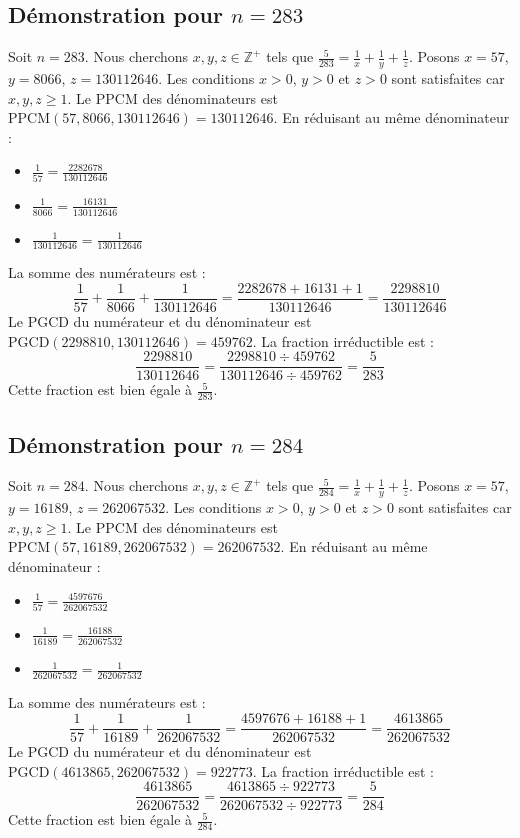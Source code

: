 \documentclass[11pt,a4paper]{article}
\begin{document}
\subsection{Démonstration pour $n = 283$}
Soit $n = 283$. Nous cherchons $x, y, z \in \mathbb{Z}^{+}$ tels que $\frac{5}{283} = \frac{1}{x} + \frac{1}{y} + \frac{1}{z}$.
Posons $x = 57$, $y = 8066$, $z = 130112646$.
Les conditions $x > 0$, $y > 0$ et $z > 0$ sont satisfaites car $x, y, z \geq 1$.
Le PPCM des dénominateurs est $\text{PPCM}(57, 8066, 130112646) = 130112646$.
En réduisant au même dénominateur :
\begin{itemize}
    \item $\frac{1}{57} = \frac{2282678}{130112646}$
    \item $\frac{1}{8066} = \frac{16131}{130112646}$
    \item $\frac{1}{130112646} = \frac{1}{130112646}$
\end{itemize}
La somme des numérateurs est :
$$ \frac{1}{57} + \frac{1}{8066} + \frac{1}{130112646} = \frac{2282678 + 16131 + 1}{130112646} = \frac{2298810}{130112646} $$
Le PGCD du numérateur et du dénominateur est $\text{PGCD}(2298810, 130112646) = 459762$.
La fraction irréductible est :
$$ \frac{2298810}{130112646} = \frac{2298810 \div 459762}{130112646 \div 459762} = \frac{5}{283} $$
Cette fraction est bien égale à $\frac{5}{283}$.

\subsection{Démonstration pour $n = 284$}
Soit $n = 284$. Nous cherchons $x, y, z \in \mathbb{Z}^{+}$ tels que $\frac{5}{284} = \frac{1}{x} + \frac{1}{y} + \frac{1}{z}$.
Posons $x = 57$, $y = 16189$, $z = 262067532$.
Les conditions $x > 0$, $y > 0$ et $z > 0$ sont satisfaites car $x, y, z \geq 1$.
Le PPCM des dénominateurs est $\text{PPCM}(57, 16189, 262067532) = 262067532$.
En réduisant au même dénominateur :
\begin{itemize}
    \item $\frac{1}{57} = \frac{4597676}{262067532}$
    \item $\frac{1}{16189} = \frac{16188}{262067532}$
    \item $\frac{1}{262067532} = \frac{1}{262067532}$
\end{itemize}
La somme des numérateurs est :
$$ \frac{1}{57} + \frac{1}{16189} + \frac{1}{262067532} = \frac{4597676 + 16188 + 1}{262067532} = \frac{4613865}{262067532} $$
Le PGCD du numérateur et du dénominateur est $\text{PGCD}(4613865, 262067532) = 922773$.
La fraction irréductible est :
$$ \frac{4613865}{262067532} = \frac{4613865 \div 922773}{262067532 \div 922773} = \frac{5}{284} $$
Cette fraction est bien égale à $\frac{5}{284}$.
\end{document}

